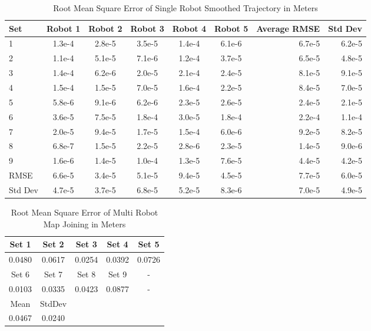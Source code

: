 \documentclass[12pt]{report}
\begin{document}
\begin{center}
\begin{table}[h]
  \caption{Root Mean Square Error of Single Robot Smoothed Trajectory in Meters}
  \begin{tabular}{| l | c | c | c | c | c || r ||r |}
    \hline
     Set & Robot 1 & Robot 2 & Robot 3 & Robot 4 & Robot 5 & Average RMSE & Std Dev \\ \hline \hline
	 1 & 1.3e-4 & 2.8e-5 & 3.5e-5 & 1.4e-4 & 6.1e-6 & 6.7e-5 & 6.2e-5\\ \hline
     2 & 1.1e-4 & 5.1e-5 & 7.1e-6 & 1.2e-4 & 3.7e-5 & 6.5e-5 & 4.8e-5\\ \hline
     3 & 1.4e-4 & 6.2e-6 & 2.0e-5 & 2.1e-4 & 2.4e-5 & 8.1e-5 & 9.1e-5\\ \hline
     4 & 1.5e-4 & 1.5e-5 & 7.0e-5 & 1.6e-4 & 2.2e-5 & 8.4e-5 & 7.0e-5\\ \hline
     5 & 5.8e-6 & 9.1e-6 & 6.2e-6 & 2.3e-5 & 2.6e-5 & 2.4e-5 & 2.1e-5\\ \hline
     6 & 3.6e-5 & 7.5e-5 & 1.8e-4 & 3.0e-5 & 1.8e-4 & 2.2e-4 & 1.1e-4\\ \hline
     7 & 2.0e-5 & 9.4e-5 & 1.7e-5 & 1.5e-4 & 6.0e-6 & 9.2e-5 & 8.2e-5\\ \hline
     8 & 6.8e-7 & 1.5e-5 & 2.2e-5 & 2.8e-6 & 2.3e-5 & 1.4e-5 & 9.0e-6\\ \hline
     9 & 1.6e-6 & 1.4e-5 & 1.0e-4 & 1.3e-5 & 7.6e-5 & 4.4e-5 & 4.2e-5\\ \hline
    \hline
    RMSE & 6.6e-5 & 3.4e-5 & 5.1e-5 & 9.4e-5 & 4.5e-5 & 7.7e-5 & 6.0e-5\\ \hline
    Std Dev & 4.7e-5 & 3.7e-5 & 6.8e-5 & 5.2e-5 & 8.3e-6 & 7.0e-5 & 4.9e-5\\ \hline
    \hline	
  \end{tabular}
  \end{table}
\end{center}

\begin{center}
\begin{table}[h]
  \caption{Root Mean Square Error of Multi Robot Map Joining in Meters}
  \begin{tabular}{| c | c | c | c | c | }
    \hline
     Set 1 & Set 2 & Set 3 & Set 4 & Set 5\\ \hline
     0.0480 & 0.0617 & 0.0254 & 0.0392 & 0.0726\\ \hline 
    Set 6  & Set 7  & Set 8 & Set 9 & -\\ \hline
    0.0103 &  0.0335 & 0.0423 & 0.0877 & - \\ \hline
	Mean & StdDev & & & \\ \hline
	0.0467 & 0.0240 & & & \\ \hline
  \end{tabular}
  \end{table}
\end{center}
\end{document}
